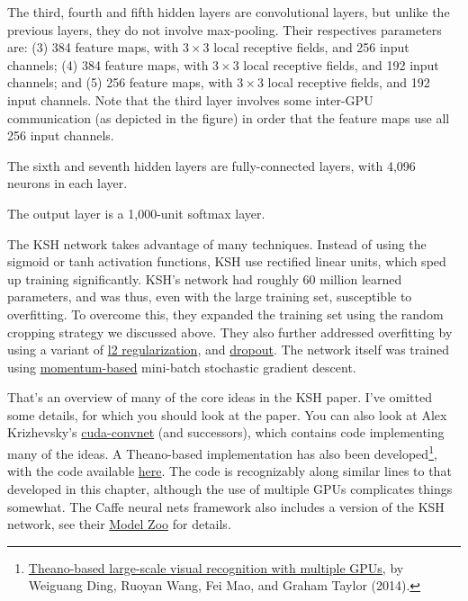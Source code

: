 \documentclass[a4paper,twoside,10pt]{book}
\begin{document}
The third, fourth and fifth hidden layers are convolutional layers, but unlike the previous layers, they do not involve max-pooling. Their respectives parameters are: (3) 384 feature maps, with $3\times3$ local receptive fields, and 256 input channels; (4) 384 feature maps, with $3\times3$ local receptive fields, and 192 input channels; and (5) 256 feature maps, with $3\times3$ local receptive fields, and 192 input channels. Note that the third layer involves some inter-GPU communication (as depicted in the figure) in order that the feature maps use all 256 input channels.

The sixth and seventh hidden layers are fully-connected layers, with 4,096 neurons in each layer.

The output layer is a 1,000-unit softmax layer.

The KSH network takes advantage of many techniques. Instead of using the sigmoid or tanh activation functions, KSH use rectified linear units, which sped up training significantly. KSH's network had roughly 60 million learned parameters, and was thus, even with the large training set, susceptible to overfitting. To overcome this, they expanded the training set using the random cropping strategy we discussed above. They also further addressed overfitting by using a variant of \hyperref[sec:3.2.1]{l2 regularization}, and \hyperref[sec:3.6]{dropout}. The network itself was trained using \hyperref[sec:3.6.1]{momentum-based} mini-batch stochastic gradient descent.

That's an overview of many of the core ideas in the KSH paper. I've omitted some details, for which you should look at the paper. You can also look at Alex Krizhevsky's \href{https://code.google.com/p/cuda-convnet/}{cuda-convnet} (and successors), which contains code implementing many of the ideas. A Theano-based implementation has also been developed\footnote{\href{http://arxiv.org/abs/1412.2302}{Theano-based large-scale visual recognition with multiple GPUs}, by Weiguang Ding, Ruoyan Wang, Fei Mao, and Graham Taylor (2014).}, with the code available \href{https://github.com/uoguelph-mlrg/theano_alexnet}{here}. The code is recognizably along similar lines to that developed in this chapter, although the use of multiple GPUs complicates things somewhat. The Caffe neural nets framework also includes a version of the KSH network, see their \href{http://caffe.berkeleyvision.org/model_zoo.html}{Model Zoo} for details.
\end{document}
